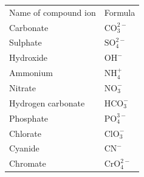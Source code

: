 \begin{enumerate}[noitemsep, label=\textbf{\arabic*}. ]
\begin{table}[H]
        \begin{center}
      \label{m38708*id64235}
    \noindent
      \tablelasttail{}
      \begin{xtabular}[t]{|l|l|}\hline
        Name of compound ion &
        Formula%
     \tabularnewline{}
        Carbonate &
        $\mathrm{CO}_{3}^{2-}$ %
     \tabularnewline{}
        Sulphate &
         $\mathrm{SO}_{4}^{2-}$%
     \tabularnewline{}
        Hydroxide &
        ${\mathrm{OH}}^{-}$%
     \tabularnewline{}
        Ammonium &
        $\mathrm{NH}_{4}^{+}$%
     \tabularnewline{}
        Nitrate &
        $\mathrm{NO}_{3}^{-}$%
     \tabularnewline{}
        Hydrogen carbonate &
        $\mathrm{HCO}_{3}^{-}$%
     \tabularnewline{}
        Phosphate &
        $\mathrm{PO}_{4}^{3-}$%
     \tabularnewline{}
        Chlorate &
        $\mathrm{ClO}_{3}^{-}$%
     \tabularnewline{}
        Cyanide &
        ${\mathrm{CN}}^{-}$%
     \tabularnewline{}
        Chromate &
        $\mathrm{CrO}_{4}^{2-}$%
     \tabularnewline{}

\end{xtabular}
\end{center}
\end{table}
\end{enumerate}
